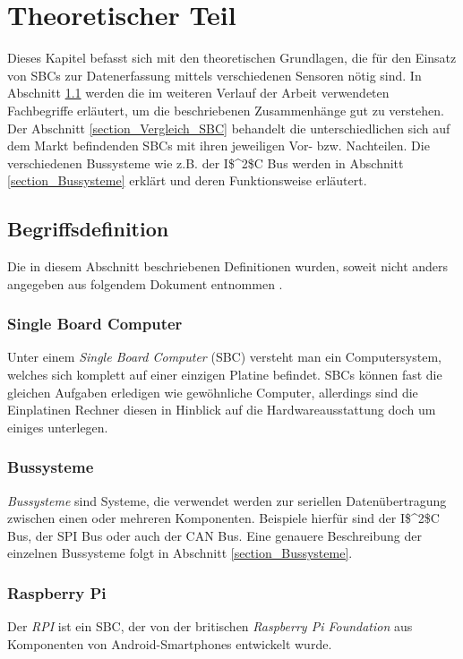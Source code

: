 \chapter{Theoretischer Teil}
\label{chapter_TheoretischerTeil}
Dieses Kapitel befasst sich mit den theoretischen Grundlagen, die für den Einsatz von \acp{SBC} zur Datenerfassung mittels verschiedenen Sensoren nötig sind. In Abschnitt \ref{section_Begriffsdefiniton} werden die im weiteren Verlauf der Arbeit verwendeten Fachbegriffe erläutert, um die beschriebenen Zusammenhänge gut zu verstehen. Der Abschnitt \ref{section_Vergleich_SBC} behandelt die unterschiedlichen sich auf dem Markt befindenden \acp{SBC} mit ihren jeweiligen Vor- bzw. Nachteilen. Die verschiedenen Bussysteme wie z.B. der \ac{I$^2$C}  Bus werden in Abschnitt \ref{section_Bussysteme} erklärt und deren Funktionsweise erläutert. 


\section{Begriffsdefinition}
\label{section_Begriffsdefiniton}
Die in diesem Abschnitt beschriebenen Definitionen wurden, soweit nicht anders angegeben aus folgendem Dokument entnommen \citep{Bussysteme_in_der_Praxis}.

\subsection*{Single Board Computer}
Unter einem \textit{Single Board Computer} (\ac{SBC}) versteht man ein Computersystem, welches sich komplett auf einer einzigen Platine befindet. \acp{SBC} können fast die gleichen Aufgaben erledigen wie gewöhnliche Computer, allerdings sind die Einplatinen Rechner diesen in Hinblick auf die Hardwareausstattung doch um einiges unterlegen.

\subsection*{Bussysteme}
\textit{Bussysteme} sind Systeme, die verwendet werden zur seriellen Datenübertragung zwischen einen oder mehreren Komponenten. Beispiele hierfür sind der \ac{I$^2$C} Bus, der \ac{SPI} Bus oder auch der \ac{CAN} Bus. Eine genauere Beschreibung der einzelnen Bussysteme folgt in Abschnitt \ref{section_Bussysteme}.

\subsection*{Raspberry Pi}
Der \textit{\ac{RPI}} ist ein \ac{SBC}, der von der britischen \textit{Raspberry Pi Foundation} aus Komponenten von Android-Smartphones entwickelt wurde.

